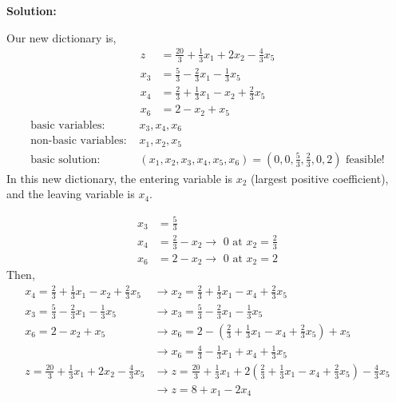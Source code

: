 \documentclass[11pt]{article}
\newenvironment{solution}
  {\par\noindent\textbf{Solution:}\par}
  {\par}
\begin{document}
\begin{solution}
Our new dictionary is,
  \[
  \begin{aligned}
    z &= \frac{20}{3} + \frac{1}{3}x_1  +2x_2 -\frac{4}{3}x_5\\ 
    x_3 &= \frac{5}{3} -\frac{2}{3}x_1 - \frac{1}{3}x_5 \\ 
    x_4 &= \frac{2}{3} +\frac{1}{3} x_1 -x_2 + \frac{2}{3}x_5\\ 
    x_6 &= 2-x_2+x_5 
  \end{aligned}
  \]
\[
  \begin{aligned}
    \text{basic variables: } &x_3,x_4,x_6 \\ 
    \text{non-basic variables: } &x_1,x_2,x_5 \\ 
    \text{basic solution: } &(x_1,x_2,x_3,x_4,x_5,x_6) = (0,0,\frac{5}{3},\frac{2}{3},0,2) \text{ feasible!}
  \end{aligned}
\]
In this new dictionary, the entering variable is $x_2$ (largest positive coefficient), and the leaving variable is $x_4$. 

\[ 
  \begin{aligned}
    x_3 &= \frac{5}{3} \\ 
    x_4 &= \frac{2}{3}-x_2 \to \text{ 0 at }x_2 = \frac{2}{3} \\ 
    x_6 &= 2-x_2 \to \text{ 0 at }x_2=2
  \end{aligned}
\]
Then,
\[
  \begin{aligned}
    x_4 = \frac{2}{3} +\frac{1}{3} x_1 -x_2 + \frac{2}{3}x_5 &\to x_2 = \frac{2}{3} +\frac{1}{3} x_1 -x_4 + \frac{2}{3}x_5 \\  
    x_3 = \frac{5}{3} -\frac{2}{3}x_1 - \frac{1}{3}x_5 &\to  x_3 = \frac{5}{3} -\frac{2}{3}x_1 - \frac{1}{3}x_5  \\
    x_6 = 2-x_2 +x_5 &\to x_6 = 2-(\frac{2}{3} +\frac{1}{3} x_1 -x_4 + \frac{2}{3}x_5) + x_5 \\ 
                     &\to x_6 = \frac{4}{3} -\frac{1}{3}x_1 +x_4 + \frac{1}{3}x_5  \\ 
    z = \frac{20}{3} + \frac{1}{3}x_1  +2x_2 -\frac{4}{3}x_5 &\to z = \frac{20}{3} + \frac{1}{3}x_1  +2(\frac{2}{3} +\frac{1}{3} x_1 -x_4 + \frac{2}{3}x_5) -\frac{4}{3}x_5 \\ 
                                                             &\to z=  8 +x_1 -2x_4
  \end{aligned}
\]


\end{solution}
\end{document}
